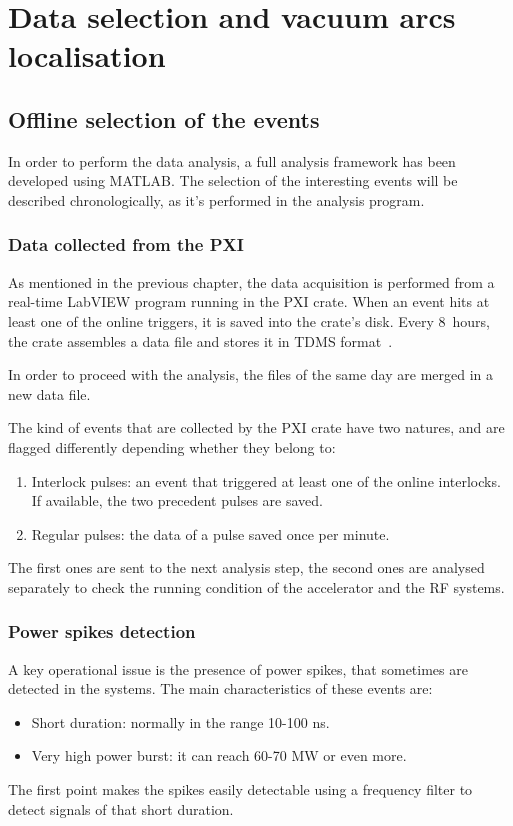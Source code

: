 \chapter[Data selection and vacuum arcs localisation]{Data selection and vacuum arcs localisation}

\section[Offline selection of the events]{Offline selection of the events}

In order to perform the data analysis, a full analysis framework has been developed using MATLAB. The selection of the interesting events will be described chronologically, as it's performed in the analysis program.

\subsection[Data collected from the PXI]{Data collected from the PXI}

As mentioned in the previous chapter, the data acquisition is performed from a real-time LabVIEW program running in the PXI crate. When an event hits at least one of the online triggers, it is saved into the crate's disk. Every 8~hours, the crate assembles a data file and stores it in TDMS format~\cite{NI:TDMS}. 

In order to proceed with the analysis, the files of the same day are merged in a new data file.

The kind of events that are collected by the PXI crate have two natures, and are flagged differently depending whether they belong to:
\begin{enumerate}
\item Interlock pulses: an event that triggered at least one of the online interlocks. If available, the two precedent pulses are saved.
\item Regular pulses: the data of a pulse saved once per minute.
\end{enumerate}
The first ones are sent to the next analysis step, the second ones are analysed separately to check the running condition of the accelerator and the RF systems.

\subsection[Power spikes detection]{Power spikes detection}

A key operational issue is the presence of power spikes, that sometimes are detected in the systems. The main characteristics of these events are:
\begin{itemize}
\item Short duration: normally in the range 10-100 ns.
\item Very high power burst: it can reach 60-70 MW or even more.
\end{itemize}
The first point makes the spikes easily detectable using a frequency filter to detect signals of that short duration. 

